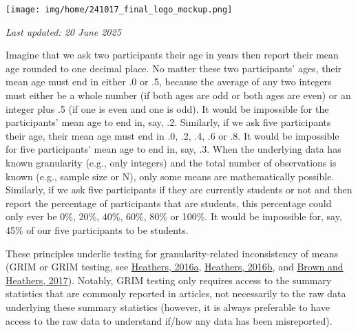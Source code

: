 \documentclass[letterpaper, 12pt]{article}
\begin{document}
\flushleft\texttt{[image: img/home/241017\_final\_logo\_mockup.png]}

\textit{Last updated: 20 June 2025}


Imagine that we ask two participants their age in years then report their mean age rounded to one decimal place. No matter these two participants' ages, their mean age must end in either .0 or .5, because the average of any two integers must either be a whole number (if both ages are odd or both ages are even) or an integer plus .5 (if one is even and one is odd). It would be impossible for the participants' mean age to end in, say, .2. Similarly, if we ask five participants their age, their mean age must end in .0, .2, .4, .6 or .8. It would be impossible for five participants' mean age to end in, say, .3. When the underlying data has known granularity (e.g., only integers) and the total number of observations is known (e.g., sample size or N), only some means are mathematically possible. Similarly, if we ask five participants if they are currently students or not and then report the percentage of participants that are students, this percentage could only ever be 0\%, 20\%, 40\%, 60\%, 80\% or 100\%. It would be impossible for, say, 45\% of our five participants to be students.

These principles underlie testing for granularity-related inconsistency of means (GRIM or GRIM testing, see \href{https://jamesheathers.medium.com/the-grim-test-a-method-for-evaluating-published-research-9a4e5f05e870}{Heathers, 2016a}, \href{https://jamesheathers.medium.com/the-grim-test-further-points-follow-ups-and-future-directions-afd55ff67bb0#.vmgjvdvkf}{Heathers, 2016b}, and \href{https://doi.org/10.1177/1948550616673876}{Brown and Heathers, 2017}). Notably, GRIM testing only requires access to the summary statistics that are commonly reported in articles, not necessarily to the raw data underlying these summary statistics (however, it is always preferable to have access to the raw data to understand if/how any data has been misreported).

\end{document}
